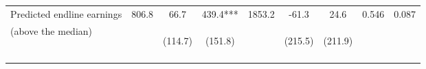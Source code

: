 \begin{tabular}{lcccccccc}
\\
Predicted endline earnings &  806.8 & 66.7  & 439.4*** & 1853.2 & -61.3 &  24.6 & 0.546 & 0.087\\
(above the median) & & \begin{footnotesize}(114.7)\end{footnotesize} & \begin{footnotesize}(151.8)\end{footnotesize} &&
\begin{footnotesize}(215.5)\end{footnotesize} & \begin{footnotesize}(211.9)\end{footnotesize}\\\noalign{\smallskip}\hline
\end{tabular}
